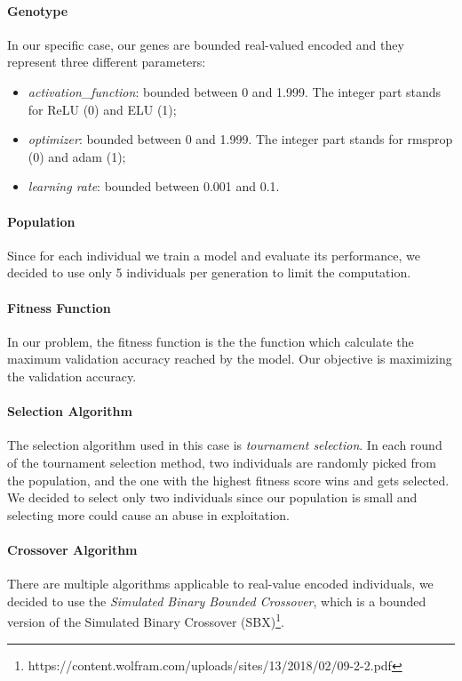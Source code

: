 \paragraph{Genotype}
In our specific case, our genes are bounded real-valued encoded and they represent three different parameters:
\begin{itemize}
\item \textit{activation\_function}: bounded between 0 and 1.999. The integer part stands for ReLU (0) and ELU (1);
\item \textit{optimizer}: bounded between 0 and 1.999. The integer part stands for rmsprop (0) and adam (1);
\item \textit{learning rate}: bounded between 0.001 and 0.1.
\end{itemize}

\paragraph{Population}
Since for each individual we train a model and evaluate its performance, we decided to use only 5 individuals per generation to limit the computation.

\paragraph{Fitness Function}
In our problem, the fitness function is the the function which calculate the maximum validation accuracy reached by the model. Our objective is maximizing the validation accuracy.

\paragraph{Selection Algorithm}
The selection algorithm used in this case is \textit{tournament selection}. In each round of the tournament selection method, two individuals are randomly picked from the population, and the one with the highest fitness score wins and gets selected. We decided to select only two individuals since our population is small and selecting more could cause an abuse in exploitation.

\paragraph{Crossover Algorithm}
There are multiple algorithms applicable to real-value encoded individuals, we decided to use the \textit{Simulated Binary Bounded Crossover}, which is a bounded version of the Simulated Binary Crossover (SBX)\footnote{https://content.wolfram.com/uploads/sites/13/2018/02/09-2-2.pdf}.


